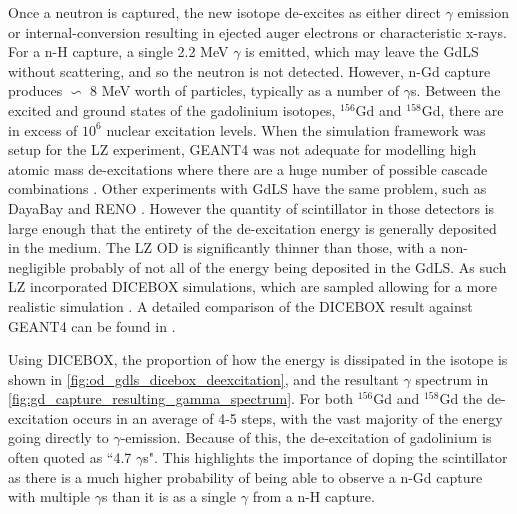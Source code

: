 \par
Once a neutron is captured, the new isotope de-excites as either direct $\gamma$ emission or internal-conversion resulting in ejected auger electrons or characteristic x-rays.
For a n-H capture, a single 2.2 MeV $\gamma$ is emitted, which may leave the GdLS without scattering, and so the neutron is not detected.
However, n-Gd capture produces $\backsim$ 8 MeV worth of particles, typically as a number of $\gamma$s.
Between the excited and ground states of the gadolinium isotopes, ${}^{156}$Gd and ${}^{158}$Gd, there are in excess of $10^{6}$ nuclear excitation levels.
When the simulation framework was setup for the LZ experiment, GEANT4 was not adequate for modelling high atomic mass de-excitations where there are a huge number of possible cascade combinations \cite{ucsb_gdls_dicebox_simulations_ref}.
Other experiments with GdLS have the same problem, such as DayaBay \cite{dayabay_overview_ref} and RENO \cite{reno_overview_ref}.
However the quantity of scintillator in those detectors is large enough that the entirety of the de-excitation energy is generally deposited in the medium.
The LZ OD is significantly thinner than those, with a non-negligible probably of not all of the energy being deposited in the GdLS.
As such LZ incorporated DICEBOX \cite{dicebox_simulations_ref} simulations, which are sampled allowing for a more realistic simulation \cite{lz_simulations_ref}.
A detailed comparison of the DICEBOX result against GEANT4 can be found in \cite{ucsb_gdls_dicebox_simulations_ref}.
\par
Using DICEBOX, the proportion of how the energy is dissipated in the isotope is shown in \autoref{fig:od_gdls_dicebox_deexcitation}, and the resultant $\gamma$ spectrum in \autoref{fig:gd_capture_resulting_gamma_spectrum}.
For both ${}^{156}$Gd and ${}^{158}$Gd the de-excitation occurs in an average of 4-5 steps, with the vast majority of the energy going directly to $\gamma$-emission.
Because of this, the de-excitation of gadolinium is often quoted as ``4.7 $\gamma$s".
This highlights the importance of doping the scintillator as there is a much higher probability of being able to observe a n-Gd capture with multiple $\gamma$s than it is as a single $\gamma$ from a n-H capture.



